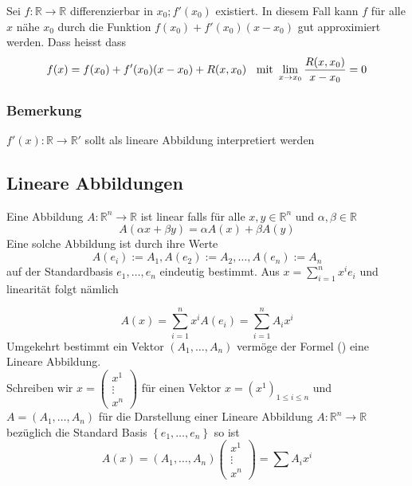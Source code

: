 Sei $f:\mathbb{R}\rightarrow\mathbb{R}$ differenzierbar in $x_0;f'(x_0)$ existiert. In diesem Fall kann $f$ für alle $x$ nähe $x_0$ durch die Funktion $f(x_0)+f'(x_0)(x-x_0)$ gut approximiert werden. Dass heisst dass $$f(x)=f(x_0)+f'(x_0)(x-x_0)+R(x,x_0)\text{ \hspace{2mm}mit  }\mathop {\lim }\limits_{x \to {x_0}} \frac{{R(x,{x_0})}}{{x - {x_0}}} = 0$$

\subsubsection*{Bemerkung}
$f'(x):\mathbb{R}\rightarrow\mathbb{R}'$ sollt als lineare Abbildung interpretiert werden
\subsection*{Lineare Abbildungen}
Eine Abbildung $A:\mathbb{R}^n\rightarrow\mathbb{R}$ ist linear falls für alle $x,y\in\mathbb{R}^n$ und $\alpha,\beta\in\mathbb{R}$ $$A\left( \alpha x+\beta y\right) =\alpha A(x)+\beta A(y)$$
Eine solche Abbildung ist durch ihre Werte $$A(e_i):=A_1,A(e_2):=A_2,\dots,A(e_n):=A_n$$ auf der Standardbasis $e_1,\dots,e_n$ eindeutig bestimmt. Aus $x = \sum\limits_{i = 1}^n {{x^i}{e_i}} $ und linearität folgt nämlich

\[
A(x) = \sum\limits_{i = 1}^n {{x^i}A({e_i}) = \sum\limits_{i = 1}^n {{A_i}{x^i}} } \tag{\textasteriskcentered}
\]
Umgekehrt bestimmt ein Vektor $\left( A_1,\dots,A_n\right)$ vermöge der Formel (\textasteriskcentered) eine Lineare Abbildung.\\

Schreiben wir $x = \left( {\begin{array}{*{20}{c}}
{{x^1}}\\
 \vdots \\
{{x^n}}
\end{array}} \right)$ für einen Vektor $x = {({x^1})_{1 \le i \le n}}$ und \\ %
$A=\left( A_1,\dots,A_n\right)$ für die Darstellung einer Lineare Abbildung $A:\mathbb{R}^n\rightarrow\mathbb{R}$ bezüglich die Standard Basis $\left\{e_1,\dots,e_n\right\}$ so ist \[A(x) = \left( {{A_1}, \ldots ,{A_n}} \right)\left( {\begin{array}{*{20}{c}}
{{x^1}}\\
 \vdots \\
{{x^n}}
\end{array}} \right) = \sum {{A_i}{x^i}} \]


